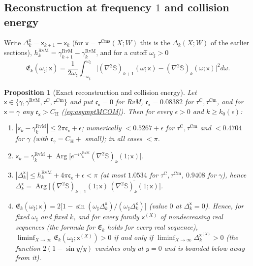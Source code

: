 \documentclass[11pt,a4paper]{article}
\numberwithin{equation}{section}
\newtheorem{proposition}[theorem]{Proposition}
\theoremstyle{definition}
\theoremstyle{remark}
\newcommand{\Cm}{\mathrm{Cm}}
\begin{document}
\subsection{Reconstruction at frequency \texorpdfstring{$1$}{1} and collision energy}\label{sec:v9-recon}
Write $\Delta^{\mathsf x}_k=\mathsf x_{k+1}-\mathsf x_k$ (for $\mathsf x=\tau^{\mathrm{Cms}}(X;W)$ this is the $\Delta_k(X;W)$ of the earlier sections), $h_k^{\mathrm{RvM}}=\gamma_{k+1}^{\mathrm{RvM}}-\gamma_k^{\mathrm{RvM}}$, and for a cutoff $\omega_\sharp>0$
\begin{equation}\label{eq:v9-energy}
\mathfrak E_k(\omega_\sharp;\mathsf x)=\frac1{2\omega_\sharp}\int_{-\omega_\sharp}^{\omega_\sharp}\bigl|(\nabla^2\mathbb S)_{k+1}(\omega;\mathsf x)-(\nabla^2\mathbb S)_k(\omega;\mathsf x)\bigr|^2d\omega .
\end{equation}
\begin{proposition}[Exact reconstruction and collision energy]\label{prop:v9-recon}
Let $\mathsf x\in\{\gamma,\gamma^{\mathrm{RvM}},\tau^{\mathrm C},\tau^{\Cm}\}$ and put $\mathfrak c_{\mathsf x}=0$ for RvM, $\mathfrak c_{\mathsf x}=0.08382$ for $\tau^{\mathrm C},\tau^{\Cm}$, and for $\mathsf x=\gamma$ any $\mathfrak c_{\mathsf x}>C_{\mathrm H}$ (\eqref{eq:asymptMCOM}). Then for every $\epsilon>0$ and $k\ge k_0(\epsilon)$:
\begin{enumerate}[label=(\roman*),leftmargin=*]
\item $|\mathsf x_k-\gamma_k^{\mathrm{RvM}}|\le2\pi\mathfrak c_{\mathsf x}+\epsilon$; numerically $<0.5267+\epsilon$ for $\tau^{\mathrm C},\tau^{\Cm}$ and $<0.4704$ for $\gamma$ (with $\mathfrak c_\gamma=C_{\mathrm H}+$ small); in all cases $<\pi$.
\item $\displaystyle\mathsf x_k=\gamma_k^{\mathrm{RvM}}+\operatorname{Arg}\bigl[e^{-i\gamma_k^{\mathrm{RvM}}}(\nabla^2\mathbb S)_k(1;\mathsf x)\bigr]$.
\item $|\Delta_k^{\mathsf x}|\le h_k^{\mathrm{RvM}}+4\pi\mathfrak c_{\mathsf x}+\epsilon<\pi$ (at most $1.0534$ for $\tau^{\mathrm C},\tau^{\Cm}$, $0.9408$ for $\gamma$), hence $\Delta_k^{\mathsf x}=\operatorname{Arg}\bigl[(\nabla^2\mathbb S)_{k+1}(1;\mathsf x)\,\overline{(\nabla^2\mathbb S)_k(1;\mathsf x)}\bigr]$.
\item $\mathfrak E_k(\omega_\sharp;\mathsf x)=2\bigl[1-\sin(\omega_\sharp\Delta_k^{\mathsf x})/(\omega_\sharp\Delta_k^{\mathsf x})\bigr]$ (value $0$ at $\Delta_k^{\mathsf x}=0$). Hence, for fixed $\omega_\sharp$ and fixed $k$, and for every family $\mathsf x^{(X)}$ of nondecreasing real sequences (the formula for $\mathfrak E_k$ holds for every real sequence), $\liminf_{X\to\infty}\mathfrak E_k(\omega_\sharp;\mathsf x^{(X)})>0$ if and only if $\liminf_{X\to\infty}\Delta_k^{\mathsf x^{(X)}}>0$ (the function $2(1-\sin y/y)$ vanishes only at $y=0$ and is bounded below away from it).
\end{enumerate}
\end{proposition}
\end{document}

